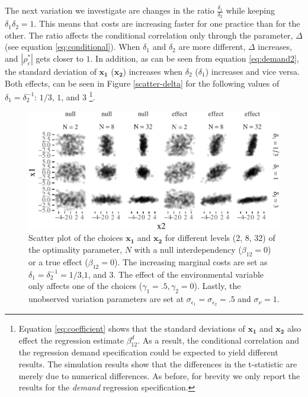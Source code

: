 \documentclass[12pt]{article}
\begin{document}
The next variation we investigate are changes in the ratio
\(\frac{\delta_1}{\delta_2}\) while keeping \(\delta_1 \delta_2 = 1\).
This means that costs are increasing faster for one practice than for
the other. The ratio affects the conditional correlation only through
the parameter, \(\Delta\) (see equation \eqref{eq:conditional}). When
\(\delta_1\) and \(\delta_2\) are more different, \(\Delta\) increases,
and \(|\rho^*_c|\) gets closer to \(1\). In addition, as can be seen
from equation \eqref{eq:demand2}, the standard deviation of
\(\mathbf{x_1}\) (\(\mathbf{x_2}\)) increases when \(\delta_2\)
(\(\delta_1\)) increases and vice versa. Both effects, can be seen in
Figure \ref{scatter-delta} for the following values of
\(\delta_1 = \delta_2^{-1}\): \(1/3\), \(1\), and \(3\) \footnote{Equation
  \eqref{eq:coefficient} shows that the standard deviations of
  \(\mathbf{x_1}\) and \(\mathbf{x_2}\) also effect the regression
  estimate \(\beta_{12}^d\). As a result, the conditional correlation
  and the regression demand specification could be expected to yield
  different results. The simulation results show that the differences in
  the t-statistic are merely due to numerical differences. As before,
  for brevity we only report the results for the \emph{demand}
  regression specification.}.

\begin{figure}

\includegraphics[width=500px]{figure-latex/scatterplot-delta2-1}
\caption[Distribution of Choices with Asymmetric Marginal Costs]
{\label{scatter-delta2} Scatter plot of the choices $\mathbf{x_1}$ and
$\mathbf{x_2}$ for different levels (2, 8, 32) of the optimality parameter, $N$
with a null interdependency ($\beta_{12} = 0$) or a true effect
($\beta_{12} = 0$). The increasing marginal costs are set as
$\delta_1 = \delta_2^{-1} = 1/3$,$1$, and $3$. The effect of the environmental
variable only affects one of the choices ($\gamma_1 = .5, \gamma_2 = 0$).
Lastly, the unobserved variation parameters are set at
$\sigma_{\epsilon_1} = \sigma_{\epsilon_2} = .5$ and $\sigma_{\nu} = 1.$ }
\end{figure}
\end{document}

